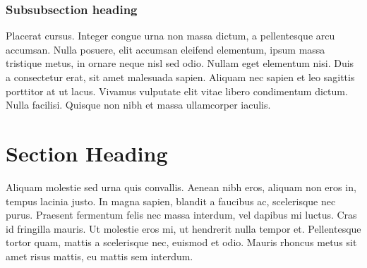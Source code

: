 \documentclass[../main.tex]{subfiles}
\begin{document}
 \subsubsection{Subsubsection heading}
 Placerat cursus. Integer congue urna non massa dictum, a pellentesque arcu accumsan. Nulla posuere, elit accumsan eleifend elementum, ipsum massa tristique metus, in ornare neque nisl sed odio. Nullam eget elementum nisi. Duis a consectetur erat, sit amet malesuada sapien. Aliquam nec sapien et leo sagittis porttitor at ut lacus. Vivamus vulputate elit vitae libero condimentum dictum. Nulla facilisi. Quisque non nibh et massa ullamcorper iaculis.\cite{BigRudin}
 
 \section{Section Heading}
Aliquam molestie sed urna quis convallis. Aenean nibh eros, aliquam non eros in, tempus lacinia justo. In magna sapien, blandit a faucibus ac, scelerisque nec purus. Praesent fermentum felis nec massa interdum, vel dapibus mi luctus. Cras id fringilla mauris. Ut molestie eros mi, ut hendrerit nulla tempor et. Pellentesque tortor quam, mattis a scelerisque nec, euismod et odio. Mauris rhoncus metus sit amet risus mattis, eu mattis sem interdum.
\end{document}
